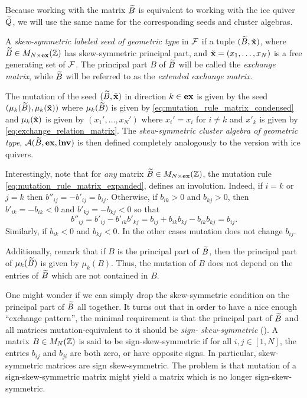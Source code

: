 Because working with the matrix $\widetilde{B}$ is equivalent to working with the ice quiver
$\widetilde{Q}$, we will use the same name for the corresponding seeds and cluster algebras.
\begin{definition}

	A \emph{skew-symmetric labeled seed of geometric type} in $\mathcal{F}$ if a tuple $(\widetilde{B}, \tilde{\mathbf{x}})$, where $\widetilde{B} \in M_{N \times
				\mathbf{ex}}(\mathbb{Z})$ has skew-symmetric principal part, and $\tilde{\mathbf{x}} = (x_1, \dots, x_N)$ is a free
	generating set of $\mathcal{F}$. The principal part $B$ of $\widetilde{B}$ will be called the
	\emph{exchange matrix}, while $\widetilde{B}$ will be referred to as the
	\emph{extended exchange matrix}.

	The mutation of the seed $(\widetilde{B}, \tilde{\mathbf{x}})$ in direction $k \in \mathbf{ex}$ is given by the seed
	$(\mu_k(\widetilde{B}), \mu_k(\tilde{\mathbf{x}}))$ where $\mu_k(\widetilde{B})$ is given by
	\cref{eq:mutation_rule_matrix_condensed} and $\mu_k(\tilde{\mathbf{x}})$ is given by $(x_1', \dots,
		x_N')$ where $x_i' = x_i$ for $i\neq k$ and $x'_k$ is given by
	\cref{eq:exchange_relation_matrix}. The \emph{skew-symmetric cluster algebra of
		geometric type}, $\mathcal{A}(\widetilde{B},
		\mathbf{ex}, \mathbf{inv})$ is then defined completely
	analogously to the version with ice quivers.
\end{definition}

Interestingly, note that for \emph{any} matrix $\widetilde{B} \in M_{N\times \mathbf{ex}}(\mathbb{Z})$, the
mutation rule \cref{eq:mutation_rule_matrix_expanded}, defines an involution. Indeed,
if $i = k$ or $j = k$ then $b''_{ij} = -b'_{ij} = b_{ij}$. Otherwise, if $b_{ik} > 0$
and $b_{kj} >0$, then $b'_{ik} = -b_{ik} < 0$ and $b'_{kj} = -b_{kj} < 0$ so that
\begin{equation*}
	b''_{ij} = b'_{ij} - b'_{ik}b'_{kj} = b_{ij} + b_{ik}b_{kj} - b_{ik}b_{kj} = b_{ij}.
\end{equation*}
%
Similarly, if $b_{ik} < 0$ and $b_{kj} < 0$. In the other cases mutation does not
change $b_{ij}$.

Additionally, remark that if $B$ is the principal part of $\widetilde{B}$, then the principal
part of $\mu_k(\widetilde{B})$ is given by $\mu_k(B)$. Thus, the mutation of $B$ does not depend
on the entries of $\widetilde{B}$ which are not contained in $B$.

One might wonder if we can simply drop the skew-symmetric condition on the principal
part of $\widetilde{B}$ all together. It turns out that in order to have a nice enough ``exchange
pattern'', the minimal requirement is that the principal part of $\widetilde{B}$ and all matrices
mutation-equivalent to it should be \emph{sign-
	skew-symmetric}
(\cite[Proposition 4.3]{FominZelevinsky2002CAF}). A matrix $B \in M_N(\mathbb{Z})$ is said to
be sign-skew-symmetric if for all $i,j \in [1, N]$, the entries $b_{ij}$ and $b_{ji}$
are both zero, or have opposite signs. In particular, skew-symmetric matrices are sign
skew-symmetric. The problem is that mutation of a sign-skew-symmetric matrix might
yield a matrix which is no longer sign-skew-symmetric.

